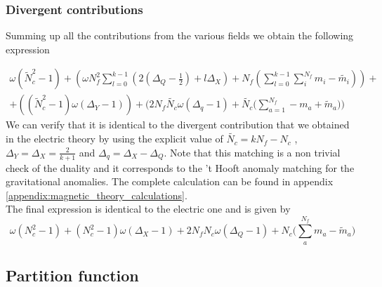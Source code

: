\subsubsection{Divergent contributions}
Summing up all the contributions from the various fields we obtain the following expression

\begin{equation}
\begin{aligned}
  \omega (\tilde{N}_c^2 -1)
+
 \left(  \omega  N_f^2 \sum _{l=0}^{k-1} \left(  2 \left( \Delta_Q - \frac{1}{2}\right) +  l \Delta_X   \right)  +N_f \left( \sum_{l=0}^{k-1} \sum_i^{N_f} m_i - \tilde{m_i}\right) \right) + \\
 + \left( (\tilde{N}_c^2-1) \omega (\Delta_Y - 1)  \right)
 +\big( 2  N_f \tilde{N_c}\omega (\Delta_q - 1 ) +  \tilde{N_c} \big( \sum_{a=1}^{N_f} - m_a + \tilde{m}_a \big)  \big)
\end{aligned}
\end{equation}
We can verify that it is identical to the divergent contribution that we obtained in the electric theory by using the explicit value of $\tilde{N_c} = k N_f - N_c$ , $\Delta_Y = \Delta_X = \frac{2}{k+1}$ and $\Delta_q  = \Delta_X - \Delta_Q$.
Note that this matching is a non trivial check of the duality and it corresponds to the 't Hooft anomaly matching for the gravitational anomalies.
The complete calculation can be found in appendix \ref{appendix:magnetic_theory_calculations}.\\
The final expression is identical to the electric one and is given by
\begin{equation}
\omega ( N_c^2 -1 ) + ( N_c^2 - 1) \omega (\Delta_X  - 1 ) + 2 N_f N_c  \omega ( \Delta_Q -1 )  + N_c \big( \sum_a^{N_f} m_a - \tilde m_a  \big)
\end{equation}


\subsection{Partition function}

